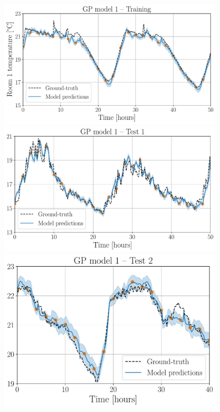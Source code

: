 \begin{figure}[!t]
	\centering
	\includegraphics[scale=0.29]{../images/chap3_room_1_temp_model_train.pdf}  \\[4pt]
	\includegraphics[scale=0.29]{../images/chap3_room_1_temp_model_test1.pdf}
	\includegraphics[scale=0.29]{../images/chap3_room_1_temp_model_test2.pdf} \\[4pt]

\end{figure}
